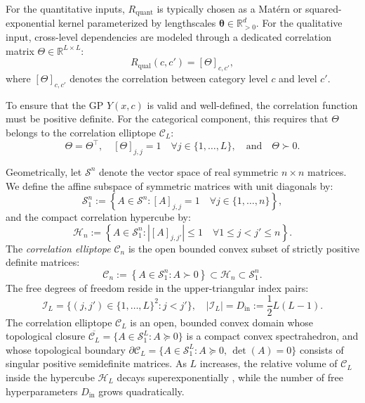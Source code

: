 \documentclass[default,sn-mathphys,Numbered]{sn-jnl}
\theoremstyle{thmstyleone}
\theoremstyle{thmstylethree}
\theoremstyle{thmstyletwo}
\newcommand{\inp}{\text{in}}
\begin{document}
For the quantitative inputs, $R_{\mathrm{quant}}$ is typically chosen as a Mat\'ern or squared-exponential kernel parameterized by lengthscales $\bm{\theta} \in \mathbb{R}_{>0}^d$. For the qualitative input, cross-level dependencies are modeled through a dedicated correlation matrix $\Theta \in \mathbb{R}^{L \times L}$:
\begin{equation}
\label{eq:qual_kernel}
R_{\mathrm{qual}}(c, c') = [\Theta]_{c, c'},
\end{equation}
where $[\Theta]_{c, c'}$ denotes the correlation between category level $c$ and level $c'$.

To ensure that the GP $Y(x, c)$ is valid and well-defined, the correlation function must be positive definite. For the categorical component, this requires that $\Theta$ belongs to the correlation elliptope $\mathcal{C}_L$:
\begin{equation}
\label{eq:corr_def}
\Theta = \Theta^\top, \quad [\Theta]_{j, j} = 1 \quad \forall j \in \{1, \ldots, L\}, \quad \text{and} \quad \Theta \succ 0.
\end{equation}

Geometrically, let $\mathcal{S}^n$ denote the vector space of real symmetric $n \times n$ matrices. We define the affine subspace of symmetric matrices with unit diagonals by:
\begin{equation}
\label{eq:S1_def}
\mathcal{S}_1^n := \left\{ A \in \mathcal{S}^n : [A]_{j, j} = 1 \quad \forall j \in \{1, \ldots, n\} \right\},
\end{equation}
and the compact correlation hypercube by:
\begin{equation}
\label{eq:Hn_def}
\mathcal{H}_n := \left\{ A \in \mathcal{S}_1^n : |[A]_{j, j'}| \le 1 \quad \forall 1 \le j < j' \le n \right\}.
\end{equation}
The \textit{correlation elliptope} $\mathcal{C}_n$ is the open bounded convex subset of strictly positive definite matrices:
\begin{equation}
\label{eq:elliptope_def}
\mathcal{C}_n := \left\{ A \in \mathcal{S}_1^n : A \succ 0 \right\} \subset \mathcal{H}_n \subset \mathcal{S}_1^n.
\end{equation}
The free degrees of freedom reside in the upper-triangular index pairs:
\begin{equation}
\label{eq:I_L}
\mathcal{I}_L = \{ (j, j') \in \{1, \ldots, L\}^2 : j < j' \}, \quad |\mathcal{I}_L| = D_{\inp} := \frac{1}{2}L(L - 1).
\end{equation}
The correlation elliptope $\mathcal{C}_L$ is an open, bounded convex domain whose topological closure $\overline{\mathcal{C}_L} = \{ A \in \mathcal{S}_1^L : A \succeq 0 \}$ is a compact convex spectrahedron, and whose topological boundary $\partial \mathcal{C}_L = \{ A \in \mathcal{S}_1^L : A \succeq 0, \, \det(A) = 0 \}$ consists of singular positive semidefinite matrices. As $L$ increases, the relative volume of $\mathcal{C}_L$ inside the hypercube $\mathcal{H}_L$ decays superexponentially \citep{Roustant,Pelamatti}, while the number of free hyperparameters $D_{\inp}$ grows quadratically.
\end{document}
